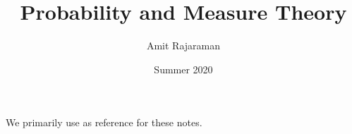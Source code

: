\documentclass{article}
\title{Probability and Measure Theory}
\author{Amit Rajaraman}
\date{Summer 2020}
\numberwithin{equation}{section}
\theoremstyle{definition}
\numberwithin{definition}{section}
\numberwithin{theorem}{section}
\theoremstyle{remark}
\numberwithin{exercise}{section}
\begin{document}
\maketitle
\thispagestyle{empty}

\setcounter {section}{-1}

\begin{center}
    We primarily use \cite{klenke} as reference for these notes.
\end{center}

\tableofcontents
\clearpage











\end{document}
